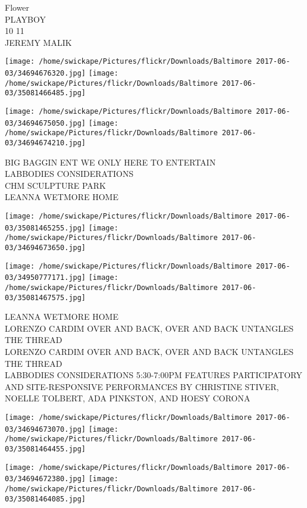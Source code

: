 \documentclass[10pt,letterpaper]{article}
\begin{document}
Flower\\
PLAYBOY\\
10 11\\
JEREMY MALIK\\
\pagebreak

\texttt{[image: /home/swickape/Pictures/flickr/Downloads/Baltimore 2017-06-03/34694676320.jpg]}
\texttt{[image: /home/swickape/Pictures/flickr/Downloads/Baltimore 2017-06-03/35081466485.jpg]}

\texttt{[image: /home/swickape/Pictures/flickr/Downloads/Baltimore 2017-06-03/34694675050.jpg]}
\texttt{[image: /home/swickape/Pictures/flickr/Downloads/Baltimore 2017-06-03/34694674210.jpg]}

BIG BAGGIN ENT WE ONLY HERE TO ENTERTAIN\\
LABBODIES CONSIDERATIONS\\
CHM SCULPTURE PARK\\
LEANNA WETMORE HOME\\
\pagebreak

\texttt{[image: /home/swickape/Pictures/flickr/Downloads/Baltimore 2017-06-03/35081465255.jpg]}
\texttt{[image: /home/swickape/Pictures/flickr/Downloads/Baltimore 2017-06-03/34694673650.jpg]}

\texttt{[image: /home/swickape/Pictures/flickr/Downloads/Baltimore 2017-06-03/34950777171.jpg]}
\texttt{[image: /home/swickape/Pictures/flickr/Downloads/Baltimore 2017-06-03/35081467575.jpg]}

LEANNA WETMORE HOME\\
LORENZO CARDIM OVER AND BACK, OVER AND BACK UNTANGLES THE THREAD\\
LORENZO CARDIM OVER AND BACK, OVER AND BACK UNTANGLES THE THREAD\\
LABBODIES CONSIDERATIONS 5:30{-}7:00PM FEATURES PARTICIPATORY AND SITE{-}RESPONSIVE PERFORMANCES BY CHRISTINE STIVER, NOELLE TOLBERT, ADA PINKSTON, AND HOESY CORONA\\
\pagebreak

\texttt{[image: /home/swickape/Pictures/flickr/Downloads/Baltimore 2017-06-03/34694673070.jpg]}
\texttt{[image: /home/swickape/Pictures/flickr/Downloads/Baltimore 2017-06-03/35081464455.jpg]}

\texttt{[image: /home/swickape/Pictures/flickr/Downloads/Baltimore 2017-06-03/34694672380.jpg]}
\texttt{[image: /home/swickape/Pictures/flickr/Downloads/Baltimore 2017-06-03/35081464085.jpg]}
\end{document}
